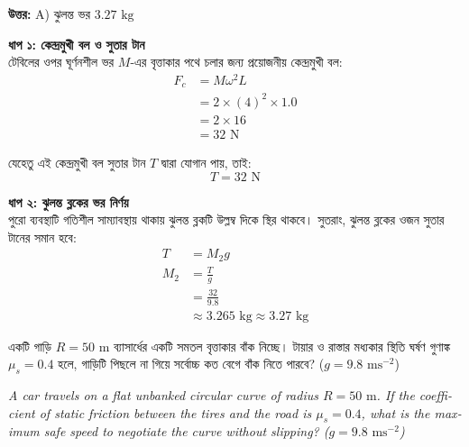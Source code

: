 \documentclass[12pt, a4paper]{article}
\begin{document}
\vspace{0.5em}
\begin{tcolorbox}[answerbox]
    \textbf{\color{success} উত্তর:} A) ঝুলন্ত ভর $3.27\text{ kg}$
\end{tcolorbox}
\vspace{1em}

\begin{tcolorbox}[solutionbox={সমাধান (Solution)}]
    \noindent
    \textbf{ধাপ ১: কেন্দ্রমুখী বল ও সুতার টান} \\
    টেবিলের ওপর ঘূর্ণনশীল ভর $M$-এর বৃত্তাকার পথে চলার জন্য প্রয়োজনীয় কেন্দ্রমুখী বল:
    \begin{align*}
        F_c &= M \omega^2 L \\
        &= 2 \times (4)^2 \times 1.0 \\
        &= 2 \times 16 \\
        &= 32\text{ N}
    \end{align*}
    
    যেহেতু এই কেন্দ্রমুখী বল সুতার টান $T$ দ্বারা যোগান পায়, তাই:
    \[ T = 32\text{ N} \]
    
    \vspace{0.5em}
    \noindent\textbf{ধাপ ২: ঝুলন্ত ব্লকের ভর নির্ণয়} \\
    পুরো ব্যবস্থাটি গতিশীল সাম্যাবস্থায় থাকায় ঝুলন্ত ব্লকটি উল্লম্ব দিকে স্থির থাকবে। 
    সুতরাং, ঝুলন্ত ব্লকের ওজন সুতার টানের সমান হবে:
    \begin{align*}
        T &= M_2 g \\
        M_2 &= \frac{T}{g} \\
        &= \frac{32}{9.8} \\
        &\approx 3.265\text{ kg} \approx \mathbf{3.27}\text{ kg}
    \end{align*}
\end{tcolorbox}

\newpage

\begin{tcolorbox}[questionbox={প্রশ্ন (Question) 16}]
    \noindent
    একটি গাড়ি $R = 50\text{ m}$ ব্যাসার্ধের একটি সমতল বৃত্তাকার বাঁক নিচ্ছে। টায়ার ও রাস্তার মধ্যকার স্থিতি ঘর্ষণ গুণাঙ্ক $\mu_s = 0.4$ হলে, গাড়িটি পিছলে না গিয়ে সর্বোচ্চ কত বেগে বাঁক নিতে পারবে? ($g = 9.8\text{ ms}^{-2}$)
    
    \vspace{0.8em}
    \begin{english}
    \noindent\textit{\color{darkgray}
    A car travels on a flat unbanked circular curve of radius $R = 50\text{ m}$. If the coefficient of static friction between the tires and the road is $\mu_s = 0.4$, what is the maximum safe speed to negotiate the curve without slipping? ($g = 9.8\text{ ms}^{-2}$)
    }
    \end{english}
\end{tcolorbox}
\end{document}
